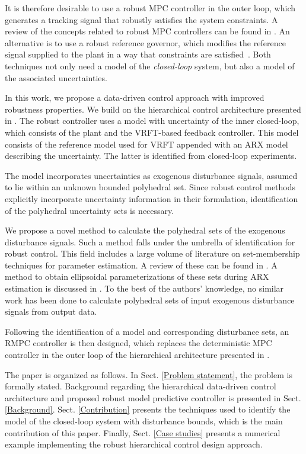 \documentclass[letterpaper, 10 pt, conference]{ieeeconf}  %
\begin{document}
It is therefore desirable to use a robust MPC controller in the outer loop, which generates a tracking signal that robustly satisfies the system constraints. A review of the concepts related to robust MPC controllers can be found in \cite{10.1007/BFb0109870}. An alternative is to use a robust reference governor, which modifies the reference signal supplied to the plant in a way that constraints are satisfied~\cite{GARONE2017306}. Both techniques not only need a model of the \emph{closed-loop} system, but also a model of the associated uncertainties.

In this work, we propose a data-driven control approach with improved robustness properties.
We build on the hierarchical control architecture presented in \cite{7932940}. The robust controller uses a model with uncertainty of the inner closed-loop, which consists of the plant and the VRFT-based feedback controller. This model consists of the reference model used for VRFT appended with an ARX model describing the uncertainty. The latter is identified from closed-loop experiments. 

The model incorporates uncertainties as exogenous disturbance signals, assumed to lie within an unknown bounded polyhedral set. Since robust control methods explicitly incorporate uncertainty information in their formulation, identification of the polyhedral uncertainty sets is necessary.

We propose a novel method to calculate the polyhedral sets of the exogenous disturbance signals. Such a method falls under the umbrella of identification for robust control.
This field includes a large volume of literature on set-membership techniques for parameter estimation. A review of these can be found in \cite{WALTER1990449}. A method to obtain ellipsoidal parameterizations of these sets during ARX estimation is discussed in \cite{7330793}. To the best of the authors' knowledge, no similar work has been done to calculate polyhedral sets of input exogenous disturbance signals from output data.

Following the identification of a model and corresponding disturbance sets, an RMPC controller is then designed, which replaces the deterministic MPC controller in the outer loop of the hierarchical architecture presented in \cite{7932940}.

The paper is organized as follows. In Sect. \ref{Problem statement}, the problem is formally stated. Background regarding the hierarchical data-driven control architecture and proposed robust model predictive controller is presented in Sect. \ref{Background}. Sect. \ref{Contribution} presents the techniques used to identify the model of the closed-loop system with disturbance bounds, which is the main contribution of this paper. Finally, Sect. \ref{Case studies} presents a numerical example implementing the robust hierarchical control design approach. 
\end{document}
